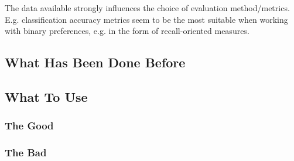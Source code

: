 The data available strongly influences the choice of evaluation method/metrics.
E.g. classification accuracy metrics seem to be the most suitable when working
with binary preferences, e.g. in the form of recall-oriented measures.

\subsection{What Has Been Done Before}



\subsection{What To Use}
\subsubsection{The Good}
\subsubsection{The Bad}
